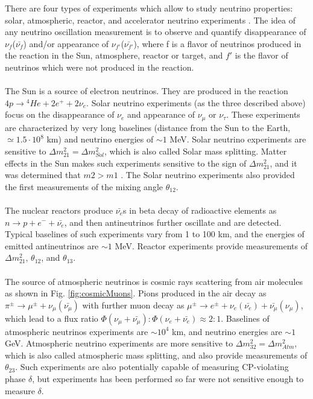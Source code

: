 There are four types of experiments which allow to study neutrino properties: solar, atmospheric, reactor, and accelerator neutrino experiments \cite{ref_PDG}. The idea of any neutrino oscillation measurement is to observe and quantify disappearance of $\nu_f$($\bar{\nu_f}$) and/or appearance of $\nu_{f'}$($\bar{\nu_{f'}}$), where f is a flavor of neutrinos produced in the reaction in the Sun, atmosphere, reactor or target, and $f'$ is the flavor of neutrinos which were not produced in the reaction.\\ \\
The Sun is a source of electron neutrinos. They are produced in the reaction $4p \rightarrow {^4}He+2e^{+}+2\nu_{e}$. Solar neutrino experiments (as the three described above) focus on the disappearance of $\nu_e$ and appearance of $\nu_\mu$ or $\nu_\tau$. These experiments are characterized by very long baselines (distance from the Sun to the Earth, $\simeq 1.5 \cdot 10^8$ km) and neutrino energies of $\sim 1$ MeV. Solar neutrino experiments are sensitive to ${\Delta}m^2_{21}={\Delta}m^2_{Sol}$, which is also called Solar mass splitting. Matter effects in the Sun makes such experiments sensitive to the sign of ${\Delta}m^2_{21}$, and it was determined that $m2>m1$ \cite{ref_presentation_NH}. The Solar neutrino experiments also provided the first measurements of the mixing angle $\theta_{12}$.\\ \\
The nuclear reactors produce $\bar{\nu_e}$s in beta decay of radioactive elements as $n \rightarrow p + e^- + \bar{\nu_e}$, and then antineutrinos further oscillate and are detected. Typical baselines of such experiments vary from 1 to 100 km, and the energies of emitted antineutrinos are $\sim 1$ MeV. Reactor experiments provide measurements of ${\Delta}m^2_{21}$, $\theta_{12}$, and $\theta_{13}$.\\ \\
The source of atmospheric neutrinos is cosmic rays scattering from air molecules as shown in Fig. \ref{fig:cosmicMuons}. Pions produced in the air decay as $\pi^{\pm} \rightarrow \mu^{\pm}+\nu_\mu(\bar{\nu_\mu})$ with further muon decay as $\mu^{\pm} \rightarrow e^{\pm}+\nu_e(\bar{\nu_e})+\bar{\nu_\mu}(\nu_\mu)$, which lead to a flux ratio $\Phi(\nu_\mu+\bar{\nu_\mu}):\Phi(\nu_e+\bar{\nu_e}) \approx 2:1$. Baselines of atmospheric neutrinos experiments are $\sim 10^4$ km, and neutrino energies are $\sim 1$ GeV. Atmospheric neutrino experiments are more sensitive to ${\Delta}m^2_{32}={\Delta}m^2_{Atm}$, which is also called atmospheric mass splitting, and also provide measurements of $\theta_{23}$. Such experiments are also potentially capable of measuring CP-violating phase $\delta$, but experiments has been performed so far were not sensitive enough to measure $\delta$. \\ \\
